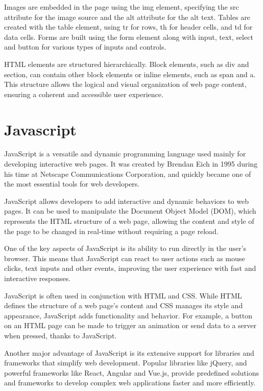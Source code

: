 Images are embedded in the page using the img element, specifying the src attribute for the image source and the alt attribute for the alt text. Tables are created with the table element, using tr for rows, th for header cells, and td for data cells. Forms are built using the form element along with input, text, select and button for various types of inputs and controls.

HTML elements are structured hierarchically. Block elements, such as div and section, can contain other block elements or inline elements, such as span and a. This structure allows the logical and visual organization of web page content, ensuring a coherent and accessible user experience.

\section{Javascript}
\label{sec:ch3sec13}
JavaScript is a versatile and dynamic programming language used mainly for developing interactive web pages. It was created by Brendan Eich in 1995 during his time at Netscape Communications Corporation, and quickly became one of the most essential tools for web developers.

JavaScript allows developers to add interactive and dynamic behaviors to web pages. It can be used to manipulate the Document Object Model (DOM), which represents the HTML structure of a web page, allowing the content and style of the page to be changed in real-time without requiring a page reload.

One of the key aspects of JavaScript is its ability to run directly in the user's browser. This means that JavaScript can react to user actions such as mouse clicks, text inputs and other events, improving the user experience with fast and interactive responses.

JavaScript is often used in conjunction with HTML and CSS. While HTML defines the structure of a web page's content and CSS manages its style and appearance, JavaScript adds functionality and behavior. For example, a button on an HTML page can be made to trigger an animation or send data to a server when pressed, thanks to JavaScript.

Another major advantage of JavaScript is its extensive support for libraries and frameworks that simplify web development. Popular libraries like jQuery, and powerful frameworks like React, Angular and Vue.js, provide predefined solutions and frameworks to develop complex web applications faster and more efficiently.

